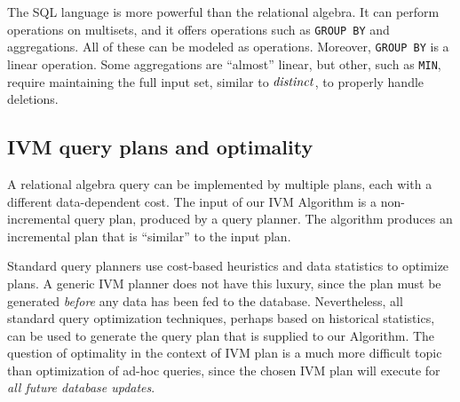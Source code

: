 The SQL language is more powerful than the relational algebra.  It can
perform operations on multisets, and it offers operations such as
\texttt{GROUP BY} and aggregations.  All of these can be modeled as
\zr operations.  Moreover, \texttt{GROUP BY} is a linear operation.
Some aggregations are ``almost'' linear, but other, such as
\texttt{MIN}, require maintaining the full input set, similar to
$\mathit{distinct}$, to properly handle deletions.

\subsection{IVM query plans and optimality}

A relational algebra query can be implemented by multiple plans, each
with a different data-dependent cost.  The input of our IVM Algorithm
is a non-incremental query plan, produced by a query planner.  The
algorithm produces an incremental plan that is ``similar'' to the
input plan.

Standard query planners use cost-based heuristics and data statistics
to optimize plans.  A generic IVM planner does not have this luxury,
since the plan must be generated \emph{before} any data has been fed
to the database.  Nevertheless, all standard query optimization
techniques, perhaps based on historical statistics, can be used to
generate the query plan that is supplied to our Algorithm.  The
question of optimality in the context of IVM plan is a much more
difficult topic than optimization of ad-hoc queries, since the chosen
IVM plan will execute for \emph{all future database updates}.

